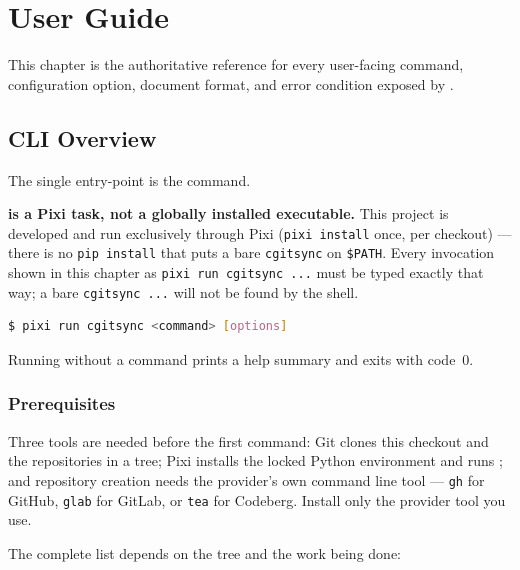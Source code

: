 \chapter{User Guide}
\label{chap:user-guide}

This chapter is the authoritative reference for every user-facing command,
configuration option, document format, and error condition exposed by
\cgspkg{}.

\section{CLI Overview}

The single entry-point is the \cgscli{} command.

\textbf{\cgscli{} is a Pixi task, not a globally installed executable.}
This project is developed and run exclusively through Pixi (\texttt{pixi
install} once, per checkout) --- there is no \texttt{pip install} that puts
a bare \texttt{cgitsync} on \texttt{\$PATH}. Every invocation shown in this
chapter as \texttt{pixi run cgitsync ...} must be typed exactly that way;
a bare \texttt{cgitsync ...} will not be found by the shell.

\begin{lstlisting}[language=bash]
$ pixi run cgitsync <command> [options]
\end{lstlisting}

Running \cgscli{} without a command prints a help summary and exits with
code~0.

\subsection{Prerequisites}

Three tools are needed before the first command: Git clones this checkout
and the repositories in a tree; Pixi installs the locked Python environment
and runs \cgscli{}; and repository creation needs the provider's own command
line tool --- \texttt{gh} for GitHub, \texttt{glab} for GitLab, or
\texttt{tea} for Codeberg. Install only the provider tool you use.

The complete list depends on the tree and the work being done:

